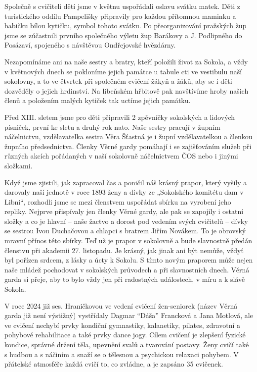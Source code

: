 Společně s cvičiteli dětí jsme v květnu uspořádali oslavu svátku matek.
Děti z turistického oddílu Pampelišky připravily pro každou přítomnou
maminku a babičku bílou kytičku, symbol tohoto svátku. Po
přeorganizování pražských žup jsme se zúčastnili prvního společného
výletu žup Barákovy a J. Podlipného do Posázaví, spojeného s návštěvou
Ondřejovské hvězdárny.

Nezapomínáme ani na naše sestry a bratry, kteří položili život za
Sokola, a vždy v květnových dnech se pokloníme jejich památce u tabule
cti ve vestibulu naší sokolovny, a to ve čtvrtek při společném cvičení
žákyň a žáků, aby se i děti dozvěděly o jejich hrdinství. Na libeňském
hřbitově pak navštívíme hroby našich členů a položením malých kytiček
tak uctíme jejich památku.

Před XIII. sletem jsme pro děti připravili 2 zpěvníčky sokolských a
lidových písniček, první ke sletu a druhý rok nato. Naše sestry pracují
v župním náčelnictvu, vzdělavatelka sestra Věra Šťastná je i župní
vzdělavatelkou a členkou župního předsednictva. Členky Věrné gardy
pomáhají i se zajišťováním služeb při různých akcích pořádaných v naší
sokolovně náčelnictvem ČOS nebo i jinými složkami.

Když jsme zjistili, jak zapracoval čas a poničil náš krásný prapor,
který vyšily a darovaly naší jednotě v roce 1893 ženy a dívky ze
„Sokolského komitétu dam v Libni``, rozhodli jsme se mezi členstvem
uspořádat sbírku na vyrobení jeho repliky. Nejprve přispívaly jen členky
Věrné gardy, ale pak se zapojily i ostatní složky a co je hlavní -- naše
žactvo a dorost pod vedením svých cvičitelů -- dívky se sestrou Ivou
Duchačovou a chlapci s bratrem Jiřím Novákem. To je obrovský mravní
přínos této sbírky. Teď už je prapor v sokolovně a bude slavnostně
předán členstvu při akademii 27. listopadu. Je krásný, jak jinak ani být
nemůže, vždyť byl pořízen srdcem, z lásky a úcty k Sokolu. S tímto novým
praporem může nejen naše mládež pochodovat v sokolských průvodech a při
slavnostních dnech. Věrná garda si přeje, aby to bylo vždy jen při
radostných událostech, v míru a k slávě Sokola.

V roce 2024 již ses. Hraničkovou ve vedení cvičení žen-seniorek (název
Věrná garda již není výstižný) vystřídaly Dagmar ``Dáša'' Francková a
Jana Motlová, ale ve cvičení nechybí prvky kondiční gymnastiky,
kalanetiky, pilates, zdravotní a pohybové rehabilitace a také prvky
dance jogy. Cílem cvičení je zlepšení fyzické kondice, správné držení
těla, upevnění svalů a tvarování postavy. Ženy cvičí také s hudbou a s
náčiním a snaží se o tělesnou a psychickou relaxaci pohybem. V přátelské
atmosféře každá cvičí to, co zvládne, a je zapsáno 35 cvičenek.

